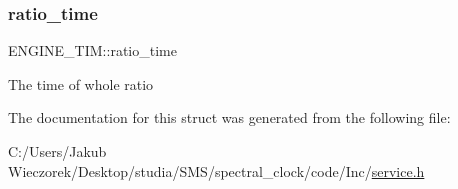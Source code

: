 \subsubsection{\texorpdfstring{ratio\+\_\+time}{ratio\_time}}
{\footnotesize\ttfamily E\+N\+G\+I\+N\+E\+\_\+\+T\+I\+M\+::ratio\+\_\+time}

The time of whole ratio 

The documentation for this struct was generated from the following file\+:\begin{DoxyCompactItemize}
\item 
C\+:/\+Users/\+Jakub Wieczorek/\+Desktop/studia/\+S\+M\+S/spectral\+\_\+clock/code/\+Inc/\mbox{\hyperlink{service_8h}{service.\+h}}\end{DoxyCompactItemize}
